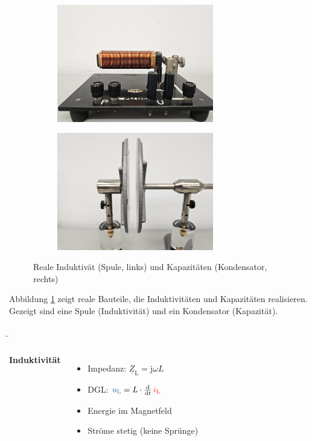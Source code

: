 \begin{frame}
{    \begin{figure}[H]\centering
        \begin{subfigure}{0.45\textwidth}\centering
            \includegraphics[width=0.75\textwidth]{./Bilder/Spule.png}
        \end{subfigure}%
        \begin{subfigure}{0.45\textwidth}\centering
            \includegraphics[width=0.75\textwidth]{./Bilder/Kondensator.png}
        \end{subfigure}
        \caption{Reale Induktivät (Spule, links) und Kapazitäten (Kondensator, rechts)}\label{fig:bauteile:realebauteile}
    \end{figure}
    Abbildung \ref{fig:bauteile:realebauteile} zeigt reale Bauteile, die Induktivitäten und Kapazitäten realisieren. 
    Gezeigt sind eine Spule (Induktivität) und ein Kondensator (Kapazität).
}
\b{%
\begin{columns}
    
    \textbf{Induktivität} 
    \begin{itemize}
        \item Impedanz: $\underline{Z}_{\mathrm L} = \mathrm{j}\omega L$
        \item DGL: $\ecv{u_{\mathrm L}} = L \cdot \frac{\d}{\d t}\, \eci{i_{\mathrm L}}$
        \item Energie im Magnetfeld
        \item Ströme stetig (keine Sprünge)
    \end{itemize}


\end{columns}}
\end{frame}
